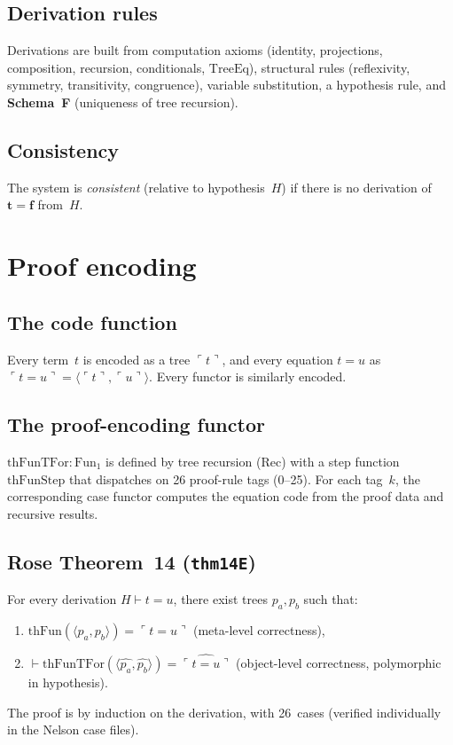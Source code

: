 \documentclass[11pt]{article}
\newcommand{\pair}[2]{\langle #1, #2 \rangle}
\newcommand{\trueT}{\mathbf{t}}
\newcommand{\falseT}{\mathbf{f}}
\newcommand{\SchemaF}{\textbf{Schema~F}}
\newcommand{\code}[1]{\ulcorner #1 \urcorner}
\newcommand{\reify}[1]{\widehat{#1}}
\newcommand{\thFun}{\mathrm{thFun}}
\newcommand{\thFunTFor}{\mathrm{thFunTFor}}
\newcommand{\TreeEq}{\mathrm{TreeEq}}
\begin{document}
\subsection*{Derivation rules}
Derivations are built from computation axioms (identity, projections,
composition, recursion, conditionals, $\TreeEq$), structural
rules (reflexivity, symmetry, transitivity, congruence),
variable substitution, a hypothesis rule, and \SchemaF{}
(uniqueness of tree recursion).

\subsection*{Consistency}
The system is \emph{consistent} (relative to hypothesis~$H$)
if there is no derivation of $\trueT = \falseT$ from~$H$.

\section{Proof encoding}

\subsection*{The code function}
Every term~$t$ is encoded as a tree $\code{t}$, and every
equation $t = u$ as $\code{t = u} = \pair{\code{t}}{\code{u}}$.
Every functor is similarly encoded.

\subsection*{The proof-encoding functor}
$\thFunTFor : \mathrm{Fun}_1$ is defined by tree recursion
($\mathrm{Rec}$) with a step function $\mathrm{thFunStep}$ that
dispatches on 26 proof-rule tags (0--25).  For each tag~$k$,
the corresponding case functor computes the equation code from
the proof data and recursive results.

\subsection*{Rose Theorem~14 (\texttt{thm14E})}
For every derivation $H \vdash t = u$, there exist trees
$p_a, p_b$ such that:
\begin{enumerate}
\item $\thFun(\pair{p_a}{p_b}) = \code{t = u}$ \quad (meta-level correctness),
\item $\vdash \thFunTFor(\pair{\reify{p_a}}{\reify{p_b}}) = \reify{\code{t = u}}$
  \quad (object-level correctness, polymorphic in hypothesis).
\end{enumerate}
The proof is by induction on the derivation, with 26~cases
(verified individually in the Nelson case files).
\end{document}
